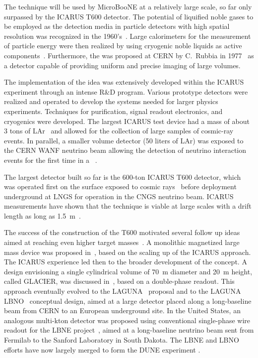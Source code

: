 The \lartpc technique will be used by MicroBooNE at a relatively large scale, so far only surpassed by the ICARUS T600 detector. The potential of liquified noble gases to be employed as the detection media in particle detectors with high spatial resolution was recognized in the 1960's~\cite{Doke:1993}. Large calorimeters for the measurement of particle energy were then realized by using cryogenic noble liquids as active components~\cite{Willis:1974}. Furthermore, the \lartpc was proposed at CERN by C.~Rubbia in 1977~\cite{Rubbia:1977} as a detector capable of providing uniform and precise imaging of large volumes. 

The implementation of the \lartpc idea was extensively developed within the ICARUS experiment through an intense R\&D program. Various prototype detectors were realized and operated to develop the systems needed for larger physics experiments.  Techniques for purification, signal readout electronics, and cryogenics were developed. The largest ICARUS test device had a mass of about 3 tons of LAr~\cite{Benetti:1993-3ton,Cennini:1994-3ton} and allowed for the collection of large samples of cosmic-ray events. In parallel, a smaller volume detector (50 liters of LAr) was exposed to the CERN WANF neutrino beam allowing the detection of neutrino interaction events for the first time in a \lartpc~\cite{Arneodo:1999-50l}. 

The largest \lartpc detector built so far is the 600-ton ICARUS T600 detector, which was operated first on the surface exposed to cosmic rays~\cite{Amerio:2004-T600} before deployment underground at LNGS for operation in the CNGS neutrino beam.  ICARUS measurements have shown that the technique is viable at large scales with a drift length as long as 1.5~m~\cite{Amoruso:2004-muon,Amoruso:2004-electron,Antonello:2004-cherenkov,Amoruso:2004-purity,Arneodo:2003-tracks}. 

The success of the construction of the T600 motivated several follow up ideas aimed at reaching even higher target masses~\cite{Aprili:2002-proposal}. A monolithic magnetized large mass device was proposed in~\cite{Cline:2003-LANNDD}, based on the scaling up of the ICARUS approach. The ICARUS experience led then to the broader development of the \lartpc concept. A \lartpc design envisioning a single cylindrical volume of 70~m diameter and 20~m height, called GLACIER, was discussed in~\cite{Rubbia:2004-glacier,Rubbia:2009-glacier}, based on a double-phase readout. This approach eventually evolved to the LAGUNA~\cite{LAGUNAcollab} proposal and to the LAGUNA LBNO~\cite{Stahl:2012-LBNO,Agarwalla:2013-LBNO} conceptual design, aimed at a large detector placed along a long-baseline beam from CERN to an European underground site.  In the United States, an analogous multi-kton detector was proposed using conventional single-phase wire readout for the LBNE project~\cite{Adams:2013-LBNE}, aimed at a long-baseline neutrino beam sent from Fermilab to the Sanford Laboratory in South Dakota.  The LBNE and LBNO efforts have now largely merged to form the DUNE experiment \cite{Acciarri:2015uup}. 

